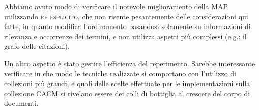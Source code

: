 \documentclass{llncs}
\begin{document}
Abbiamo avuto modo di verificare il notevole miglioramento della MAP utilizzando \textsc{rf esplicito}, che non risente pesantemente delle considerazioni qui fatte, in quanto modifica l'ordinamento basandosi solamente su informazioni di rilevanza e occorrenze dei termini, e non utilizza aspetti pi\`u complessi (e.g.: il grafo delle citazioni).

Un altro aspetto \`e stato gestire l'efficienza del reperimento. Sarebbe interessante verificare in che modo le tecniche realizzate si comportano con l'utilizzo di collezioni pi\`u grandi, e quali delle scelte effettuate per le implementazioni sulla collezione CACM si rivelano essere dei colli di bottiglia al crescere del corpo di documenti.




\end{document}
